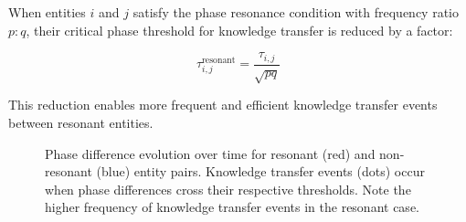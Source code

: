 \begin{theorem}
When entities $i$ and $j$ satisfy the phase resonance condition with frequency ratio $p:q$, their critical phase threshold for knowledge transfer is reduced by a factor:

\begin{equation}
\tau_{i,j}^{\text{resonant}} = \frac{\tau_{i,j}}{\sqrt{pq}}
\end{equation}

This reduction enables more frequent and efficient knowledge transfer events between resonant entities.
\end{theorem}

\begin{figure}[ht]
\centering
{}
\caption{Phase difference evolution over time for resonant (red) and non-resonant (blue) entity pairs. Knowledge transfer events (dots) occur when phase differences cross their respective thresholds. Note the higher frequency of knowledge transfer events in the resonant case.}
\label{fig:resonant_threshold_crossing}
\end{figure}





